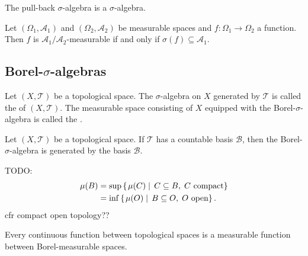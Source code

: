 The pull-back $\sigma$-algebra is a $\sigma$-algebra.

\begin{lemma}
Let $(\Omega_1, \mathcal{A}_1)$ and $(\Omega_2, \mathcal{A}_2)$ be measurable spaces and $f: \Omega_1\to \Omega_2$ a function. Then $f$ is $\mathcal{A}_1/\mathcal{A}_2$-measurable \textup{if and only if} $\sigma(f) \subseteq \mathcal{A}_1$.
\end{lemma}



\subsection{Borel-$\sigma$-algebras}
\begin{definition}
Let $(X,\mathcal{T})$ be a topological space. The $\sigma$-algebra on $X$ generated by $\mathcal{T}$ is called the  of $(X,\mathcal{T})$. The measurable space consisting of $X$ equipped with the Borel-$\sigma$-algebra is called the .
\end{definition}

\begin{lemma}
Let $(X,\mathcal{T})$ be a topological space. If $\mathcal{T}$ has a countable basis $\mathcal{B}$, then the Borel-$\sigma$-algebra is generated by the basis $\mathcal{B}$.
\end{lemma}

TODO:
\begin{align*}
\mu(B) &= \sup\left\{\left. \mu(C) \;\right|\; C\subseteq B, \; \text{$C$ compact} \right\} \\
&= \inf\left\{\left. \mu(O) \;\right|\; B\subseteq O, \; \text{$O$ open} \right\}.
\end{align*}
cfr compact open topology??

\begin{lemma}
Every continuous function between topological spaces is a measurable function between Borel-measurable spaces.
\end{lemma}

